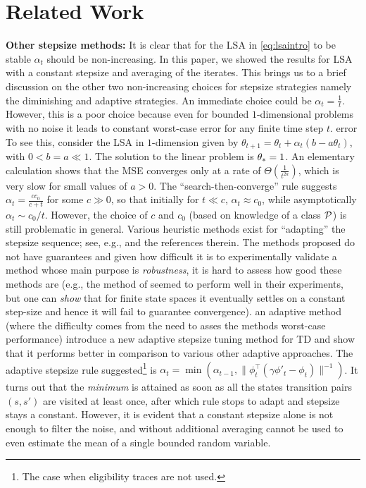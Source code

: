 \section{Related Work}\label{sec:related}
\textbf{Other stepsize methods:} 
It is clear that for the LSA in \eqref{eq:lsaintro} to be stable $\alpha_t$ should be non-increasing. In this paper, we showed the results for LSA with a constant stepsize and averaging of the iterates.  This brings us to a brief discussion on the other two non-increasing choices for stepsize strategies namely the diminishing and adaptive strategies.
An immediate choice could be $\alpha_t=\frac{1}{t}$.
However, this is a poor choice because even for bounded
$1$-dimensional problems with no noise it leads to constant worst-case error for any finite time step $t$.
error 
To see this, consider the LSA in $1$-dimension given by $\theta_{t+1}=\theta_t+\alpha_t(b-a\theta_t)$, with $0<b=a\ll 1$. The solution to the linear  problem is $\theta_*=1$.
An elementary calculation shows that the MSE converges only at a rate of $\Theta(\frac{1}{t^{2a}})$, which is very slow for small values of $a>0$. The ``search-then-converge'' rule suggests 
$\alpha_t=\frac{cc_0}{c+t}$ for some $c\gg 0$, so that initially for $t \ll c$, $\alpha_t \approx c_0$, while asymptotically $\alpha_t \sim c_0/t$. 
However, the choice of $c$ and $c_0$ (based on knowledge of a class $\mathcal{P}$) is still problematic in general.
\fi
Various heuristic methods exist for ``adapting'' the stepsize sequence; see, e.g., \citet{dab} and the references therein.
The methods proposed do not have guarantees and given how difficult it is to experimentally validate a method
whose main purpose is \emph{robustness}, it is hard to assess how good these methods are
(e.g., the method of \citet{dab} seemed to perform well in their experiments, but one can \emph{show} that for finite state spaces it eventually settles on a constant step-size and hence it will fail to guarantee convergence).
an adaptive method (where the difficulty comes from the need to asses the methods worst-case performance)
\citet{dab} introduce a new adaptive stepsize tuning method for TD and show that it performs better in comparison to various other adaptive approaches. The adaptive stepsize rule suggested\footnote{The case when eligibility traces are not used.} is $\alpha_t=\min(\alpha_{t-1},\parallel\phi^\top_t(\gamma\phi'_t-\phi_t)\parallel^{-1})$. It turns out that the \emph{minimum} is attained as soon as all the states transition pairs $(s,s')$ are visited at least once, after which rule stops to adapt and stepsize stays a constant. However, it is evident that a constant stepsize alone is not enough to filter the noise, and without additional averaging cannot be used to even estimate the mean of a single bounded random variable. 
\fi

